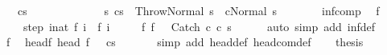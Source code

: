 \begin{isabellebody}
\ \ \ {\isachardoublequoteopen}{\isasymGamma}{\isasymturnstile}{\isacharparenleft}cs{\isacharparenright}\ {\isasymrightarrow}\ {\isasymdots}{\isacharparenleft}{\isasyminfinity}{\isacharparenright}\ {\isasymor}\ \isanewline
\ \ \ \ \ \ \ \ \ {\isacharparenleft}{\isasymexists}s{\isacharprime}{\isachardot}\ {\isasymGamma}{\isasymturnstile}{\isacharparenleft}cs{\isacharparenright}\ {\isasymrightarrow}\isactrlsup {\isacharasterisk}\ {\isacharparenleft}Throw{\isacharcomma}Normal\ s{\isacharprime}{\isacharparenright}\ {\isasymand}\ {\isasymGamma}{\isasymturnstile}{\isacharparenleft}cNormal\ s{\isacharprime}{\isacharparenright}\ {\isasymrightarrow}\ {\isasymdots}{\isacharparenleft}{\isasyminfinity}{\isacharparenright}{\isacharparenright}{\isachardoublequoteclose}\isanewline
%
\isadelimproof
%
\endisadelimproof
%
\isatagproof
{}\isamarkupfalse%
\ {\isacharminus}\isanewline
\ \ \isamarkupfalse%
\ inf{\isacharunderscore}comp\ \isamarkupfalse%
\ f\ \isanewline
\ \ \ \ step{\isacharcolon}\ {\isachardoublequoteopen}{\isasymforall}i{\isacharcolon}{\isacharcolon}nat{\isachardot}\ {\isasymGamma}{\isasymturnstile}f\ i\ {\isasymrightarrow}\ f\ {\isacharparenleft}i{\isacharplus}{}{\isacharparenright}{\isachardoublequoteclose}\ \isanewline
\ \ \ \ f{\isacharunderscore}{}{\isacharcolon}\ {\isachardoublequoteopen}f\ {}\ {\isacharequal}\ {\isacharparenleft}Catch\ c\ c\ s{\isacharparenright}{\isachardoublequoteclose}\isanewline
\ \ \ \ \isamarkupfalse%
\ {\isacharparenleft}auto\ simp\ add{\isacharcolon}\ inf{\isacharunderscore}def{\isacharparenright}\isanewline
\ \ \isamarkupfalse%
\ f{\isacharunderscore}{}\ \isamarkupfalse%
\ head{\isacharunderscore}f{\isacharunderscore}{}{\isacharcolon}\ {\isachardoublequoteopen}head\ {\isacharparenleft}f\ {}{\isacharparenright}\ {\isacharequal}\ {\isacharparenleft}cs{\isacharparenright}{\isachardoublequoteclose}\ \isanewline
\ \ \ \ \isamarkupfalse%
\ {\isacharparenleft}simp\ add{\isacharcolon}\ head{\isacharunderscore}def\ head{\isacharunderscore}com{\isacharunderscore}def{\isacharparenright}\isanewline
\ \ \isamarkupfalse%
\ {\isacharquery}thesis\isanewline
\ \ \isamarkupfalse%

\end{isabellebody}
